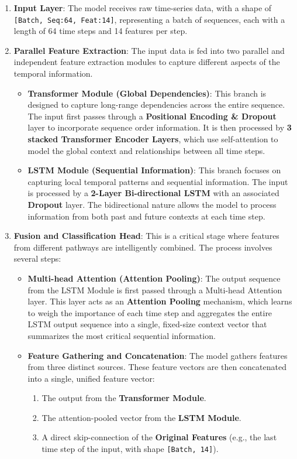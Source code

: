 \begin{enumerate}
    \item \textbf{Input Layer}: The model receives raw time-series data, with a shape of \texttt{[Batch, Seq:64, Feat:14]}, representing a batch of sequences, each with a length of 64 time steps and 14 features per step.

    \item \textbf{Parallel Feature Extraction}: The input data is fed into two parallel and independent feature extraction modules to capture different aspects of the temporal information.

    \begin{itemize}
    \item \textbf{Transformer Module (Global Dependencies)}: This branch is designed to capture long-range dependencies across the entire sequence. The input first passes through a \textbf{Positional Encoding \& Dropout} layer to incorporate sequence order information. It is then processed by \textbf{3 stacked Transformer Encoder Layers}, which use self-attention to model the global context and relationships between all time steps.

    \item \textbf{LSTM Module (Sequential Information)}: This branch focuses on capturing local temporal patterns and sequential information. The input is processed by a \textbf{2-Layer Bi-directional LSTM} with an associated \textbf{Dropout} layer. The bidirectional nature allows the model to process information from both past and future contexts at each time step.
    \end{itemize}

    \item \textbf{Fusion and Classification Head}: This is a critical stage where features from different pathways are intelligently combined. The process involves several steps:
    \begin{itemize}
    \item \textbf{Multi-head Attention (Attention Pooling)}: The output sequence from the LSTM Module is first passed through a Multi-head Attention layer. This layer acts as an \textbf{Attention Pooling} mechanism, which learns to weigh the importance of each time step and aggregates the entire LSTM output sequence into a single, fixed-size context vector that summarizes the most critical sequential information.

    \item \textbf{Feature Gathering and Concatenation}: The model gathers features from three distinct sources. These feature vectors are then concatenated into a single, unified feature vector:
    \begin{enumerate}
    \item The output from the \textbf{Transformer Module}.
    \item The attention-pooled vector from the \textbf{LSTM Module}.
    \item A direct skip-connection of the \textbf{Original Features} (e.g., the last time step of the input, with shape \texttt{[Batch, 14]}).
    \end{enumerate}


\end{itemize}
\end{enumerate}
